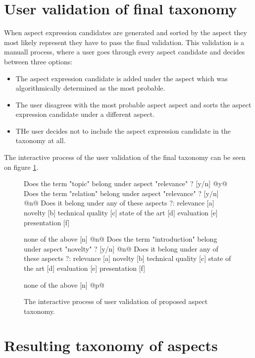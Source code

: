 \section{User validation of final taxonomy}
When aspect expression candidates are generated and sorted by the aspect they most likely represent they have to pass the final validation. This validation is a manuall process, where a user goes through every aspect candidate and decides between three options:
\begin{itemize}
\item The aspect expression candidate is added under the aspect which was algorithmically determined as the most probable.
\item The user disagrees with the most probable aspect aspect and sorts the aspect expression candidate under a different aspect.
\item THe user decides not to include the aspect expression candidate in the taxonomy at all.
\end{itemize}

The interactive process of the user validation of the final taxonomy can be seen on figure \ref{img:user_tax}.
\begin{figure}[htbp!]

\begin{commandshell}
Does the term "topic" belong under aspect "relevance" ? [y/n]
@y@
Does the term "relation" belong under aspect "relevance" ? [y/n]
@n@
Does it belong under any of these aspects ?:
relevance                [a]
novelty                  [b]
technical quality        [c]
state of the art         [d]
evaluation               [e]
presentation             [f]

none of the above        [n]
@n@
Does the term "introduction" belong under aspect "novelty" ? [y/n]
@n@
Does it belong under any of these aspects ?:
relevance                [a]
novelty                  [b]
technical quality        [c]
state of the art         [d]
evaluation               [e]
presentation             [f]

none of the above        [n]
@p@
\end{commandshell}
\caption{The interactive process of user validation of proposed aspect taxonomy.}
\label{img:user_tax}
\end{figure}
\section{Resulting taxonomy of aspects}

